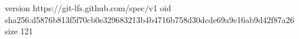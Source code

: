 version https://git-lfs.github.com/spec/v1
oid sha256:d5876b813f5f70cb0e329683213b4b4716b758d30dcde69a9e16ab9d42f87a26
size 121
